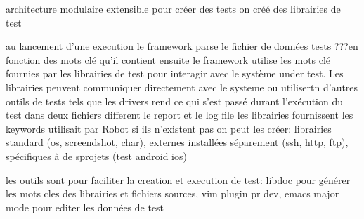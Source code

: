 
architecture modulaire extensible
pour créer des tests on créé des librairies de test 

au lancement d'une execution le framework parse le fichier de données tests
???en fonction des mots clé qu'il contient
ensuite le framework utilise les mots clé fournies par les librairies de test
pour interagir avec le système under test. Les librairies peuvent communiquer
directement avec le systeme ou utilisertn d'autres outils de tests tels que les
drivers
rend ce qui s'est passé durant l'exécution du test dans deux fichiers different
le report et le log file
les librairies fournissent les keywords utilisait par Robot si ils n'existent
pas on peut les créer: librairies standard (os, screendshot, char), externes installées séparement (ssh, http, ftp), spécifiques à de sprojets (test android ios)

les outils sont pour faciliter la creation et execution de test: libdoc pour
générer les mots cles des librairies et fichiers sources, vim plugin pr dev,
emacs major mode pour editer les données de test

